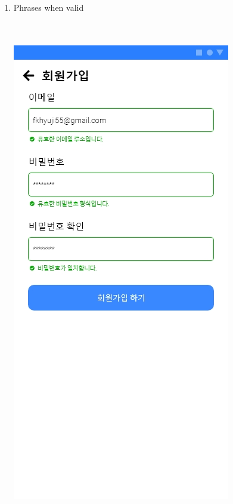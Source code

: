 \documentclass[conference]{IEEEtran}
\begin{document}
\begin{enumerate}
\begin{itemize}
\begin{enumerate}
        \\ \\ \\ \\ \\ \\ \\ \\ \\ \\ \\ \\ \\ \\ \\ \\ \\ \\ \\ \\ \\ \\ \\
        \item Phrases when valid \\ \\ \\
        \centerline{\includegraphics[scale=0.30]{4-2. 회원가입.jpg}}

\end{enumerate}
\end{itemize}
\end{enumerate}
\end{document}

